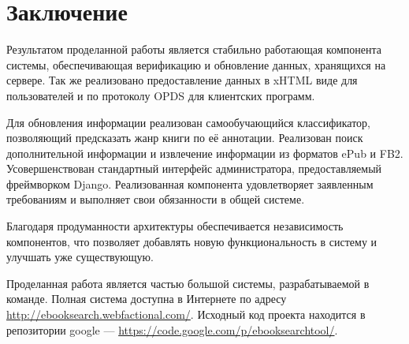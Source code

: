 \section{Заключение}

Результатом проделанной работы является стабильно работающая компонента системы, обеспечивающая верификацию и обновление данных, хранящихся на сервере. Так же реализовано предоставление данных в xHTML виде для пользователей и по протоколу OPDS для клиентских программ. 

Для обновления информации реализован самообучающийся классификатор, позволяющий предсказать жанр книги по её аннотации. Реализован поиск дополнительной информации и извлечение информации из форматов ePub и FB2. Усовершенствован стандартный интерфейс администратора, пре\-доставляемый фреймворком Django. Реализованная компонента удовлетворяет заявленным требованиям и выполняет свои обязанности в общей системе. 

Благодаря продуманности архитектуры обеспечивается независимость \\компонентов, что позволяет добавлять новую функциональность в систему и улучшать уже существующую.

Проделанная работа является частью большой системы, разрабатываемой в команде. Полная система доступна в Интернете по адресу\\ \url{http://ebooksearch.webfactional.com/}. Исходный код проекта находится в репозитории google --- \url{https://code.google.com/p/ebooksearchtool/}.
	
\newpage